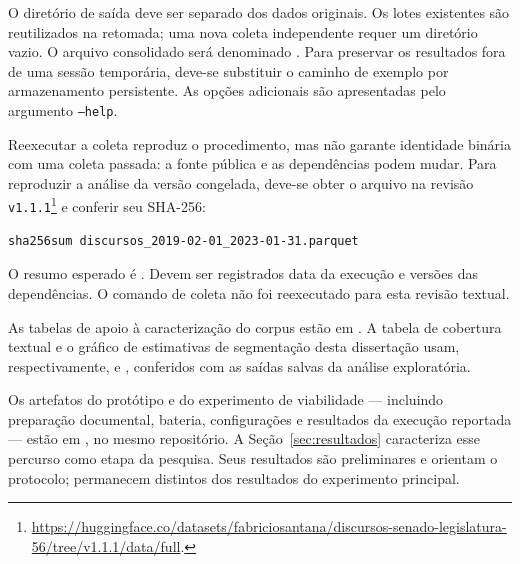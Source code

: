 O diretório de saída deve ser separado dos dados originais. Os lotes existentes são reutilizados na retomada; uma nova coleta independente requer um diretório vazio. O arquivo consolidado será denominado . Para preservar os resultados fora de uma sessão temporária, deve-se substituir o caminho de exemplo por armazenamento persistente. As opções adicionais são apresentadas pelo argumento \texttt{--help}.

Reexecutar a coleta reproduz o procedimento, mas não garante identidade binária com uma coleta passada: a fonte pública e as dependências podem mudar. Para reproduzir a análise da versão congelada, deve-se obter o arquivo na revisão \texttt{v1.1.1}\footnote{\url{https://huggingface.co/datasets/fabriciosantana/discursos-senado-legislatura-56/tree/v1.1.1/data/full}.} e conferir seu SHA-256:
\begin{verbatim}
sha256sum discursos_2019-02-01_2023-01-31.parquet
\end{verbatim}
O resumo esperado é . Devem ser registrados data da execução e versões das dependências. O comando de coleta não foi reexecutado para esta revisão textual.

As tabelas de apoio à caracterização do corpus estão em . A tabela de cobertura textual e o gráfico de estimativas de segmentação desta dissertação usam, respectivamente,  e , conferidos com as saídas salvas da análise exploratória.

Os artefatos do protótipo e do experimento de viabilidade — incluindo preparação documental, bateria, configurações e resultados da execução reportada — estão em , no mesmo repositório. A Seção~\ref{sec:resultados} caracteriza esse percurso como etapa da pesquisa. Seus resultados são preliminares e orientam o protocolo; permanecem distintos dos resultados do experimento principal.
